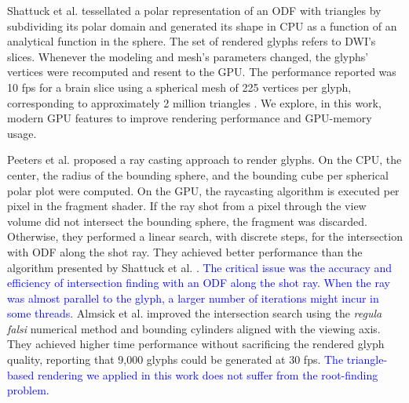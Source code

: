 \documentclass[twoside,twocolumn,10pt]{article}
\begin{document}
Shattuck et al. \cite{shattuck2008} tessellated a polar representation of an ODF with triangles by subdividing its polar domain and generated its shape in CPU as a function of an analytical function in the sphere. The set of rendered glyphs refers to DWI's slices. Whenever the modeling and mesh's parameters changed, the glyphs' vertices were recomputed and resent to the GPU. The performance reported was 10 fps for a brain slice using a spherical mesh of 225 vertices per glyph, corresponding to approximately 2 million triangles . We explore, in this work, modern GPU features to improve rendering performance and GPU-memory usage. %




Peeters et al. \cite{peeters2009} proposed a ray casting approach to render glyphs. On the CPU, the center, the radius of the bounding sphere, and the bounding cube per spherical polar plot were computed. On the GPU, the raycasting algorithm is executed per pixel in the fragment shader. If the ray shot from a pixel through the view volume did not intersect the bounding sphere, the fragment was discarded. Otherwise, they performed a linear search, with discrete steps, for the intersection with ODF along the shot ray. They achieved better performance than the algorithm presented by Shattuck et al. \cite{shattuck2008}.  \textcolor{blue}{The critical issue was the accuracy and efficiency of intersection finding with an ODF along the shot ray. When the ray was almost parallel to the glyph, a larger number of iterations might incur in some threads.} Almsick et al. \cite{almsick2011} improved the intersection search using the \textit{regula falsi} numerical method and bounding cylinders aligned with the viewing axis. They achieved higher time performance without sacrificing the rendered glyph quality, reporting that 9,000 glyphs could be generated at 30 fps.  \textcolor{blue}{The triangle-based rendering we applied in this work does not suffer from the root-finding problem.} 
\end{document}
